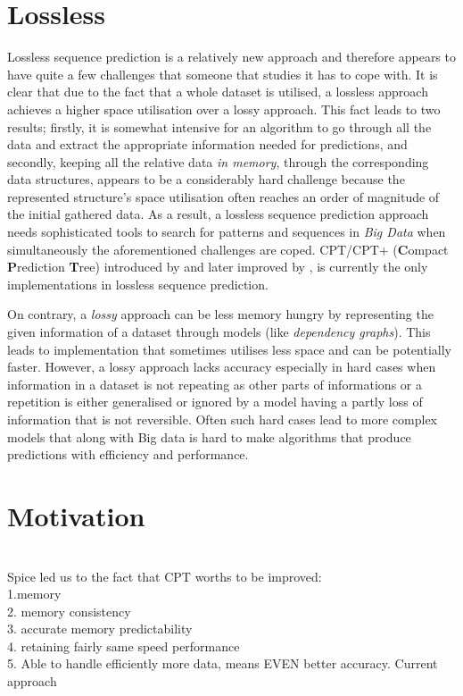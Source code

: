 \section{Lossless}\label{losslessVSlossy}
Lossless sequence prediction is a relatively new approach and therefore appears to have quite a few challenges that someone that studies it has to cope with. It is clear that due to the fact that a whole dataset is utilised, a lossless approach achieves a higher space utilisation over a lossy approach. This fact leads to two results; firstly, it is somewhat intensive for an algorithm to go through all the data and extract the appropriate information needed for predictions, and secondly, keeping all the relative data \emph{in memory}, through the corresponding data structures, appears to be a considerably hard challenge because the represented structure's space utilisation often reaches an order of magnitude of the initial gathered data. As a result, a lossless sequence prediction approach needs sophisticated tools to search for patterns and sequences in \emph{Big Data} when simultaneously the aforementioned challenges are coped. CPT/CPT+ (\textbf{C}ompact \textbf{P}rediction \textbf{T}ree) introduced by \citeauthor{gueniche_fournier-viger_tseng_2013} \citeyear{gueniche_fournier-viger_tseng_2013} and later improved by \citeauthor{gueniche_fournier-viger_raman_tseng_2015} \citeyear{gueniche_fournier-viger_raman_tseng_2015}, is currently the only implementations in lossless sequence prediction. 
\par On contrary, a \emph{lossy} approach can be less memory hungry by representing the given information of a dataset through models (like \emph{dependency graphs}). This leads to implementation that sometimes utilises less space and can be potentially faster. However, a lossy approach lacks accuracy especially in hard cases when information in a dataset is not repeating as other parts of informations or a repetition is either generalised or ignored by a model having a partly loss of information that is not reversible. Often such hard cases lead to more complex models that along with Big data is hard to make algorithms that produce predictions with efficiency and performance.
\section{Motivation}
\\ Spice led us to the fact that CPT worths to be improved:
\\ 1.memory
\\ 2. memory consistency
\\ 3. accurate memory predictability
\\ 4. retaining fairly same speed performance
\\ 5. Able to handle efficiently more data, means EVEN better accuracy.
Current approach
